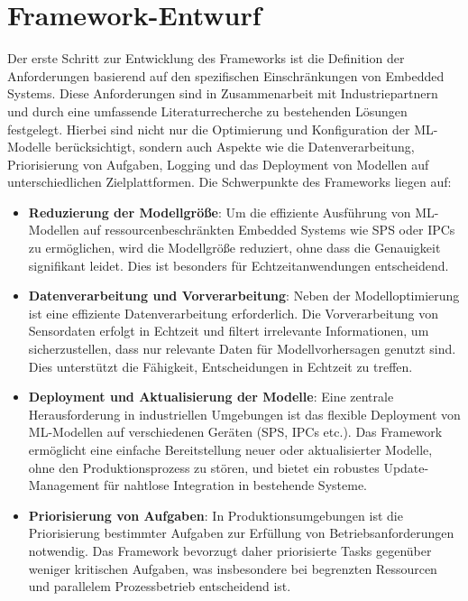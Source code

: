 \section{Framework-Entwurf}

Der erste Schritt zur Entwicklung des Frameworks ist die Definition der Anforderungen basierend auf den spezifischen Einschränkungen von Embedded Systems. 
Diese Anforderungen sind in Zusammenarbeit mit Industriepartnern und durch eine umfassende Literaturrecherche zu bestehenden Lösungen festgelegt. Hierbei sind nicht 
nur die Optimierung und Konfiguration der ML-Modelle berücksichtigt, sondern auch Aspekte wie die Datenverarbeitung, Priorisierung von Aufgaben, Logging und das Deployment 
von Modellen auf unterschiedlichen Zielplattformen. Die Schwerpunkte des Frameworks liegen auf:
\begin{itemize}
    \item \textbf{Reduzierung der Modellgröße}: Um die effiziente Ausführung von ML-Modellen auf ressourcenbeschränkten Embedded Systems wie SPS oder IPCs zu ermöglichen, 
    wird die Modellgröße reduziert, ohne dass die Genauigkeit signifikant leidet. Dies ist besonders für Echtzeitanwendungen entscheidend.   
    \item \textbf{Datenverarbeitung und Vorverarbeitung}: Neben der Modelloptimierung ist eine effiziente Datenverarbeitung erforderlich. Die Vorverarbeitung von Sensordaten 
    erfolgt in Echtzeit und filtert irrelevante Informationen, um sicherzustellen, dass nur relevante Daten für Modellvorhersagen genutzt sind. Dies unterstützt die Fähigkeit, 
    Entscheidungen in Echtzeit zu treffen.
   
    \item \textbf{Deployment und Aktualisierung der Modelle}: Eine zentrale Herausforderung in industriellen Umgebungen ist das flexible Deployment von ML-Modellen auf 
    verschiedenen Geräten (SPS, IPCs etc.). Das Framework ermöglicht eine einfache Bereitstellung neuer oder aktualisierter Modelle, ohne den Produktionsprozess zu stören, 
    und bietet ein robustes Update-Management für nahtlose Integration in bestehende Systeme.
  
    \item \textbf{Priorisierung von Aufgaben}: In Produktionsumgebungen ist die Priorisierung bestimmter Aufgaben zur Erfüllung von Betriebsanforderungen notwendig. 
    Das Framework bevorzugt daher priorisierte Tasks gegenüber weniger kritischen Aufgaben, was insbesondere bei begrenzten Ressourcen und parallelem Prozessbetrieb entscheidend ist.
   

\end{itemize}
